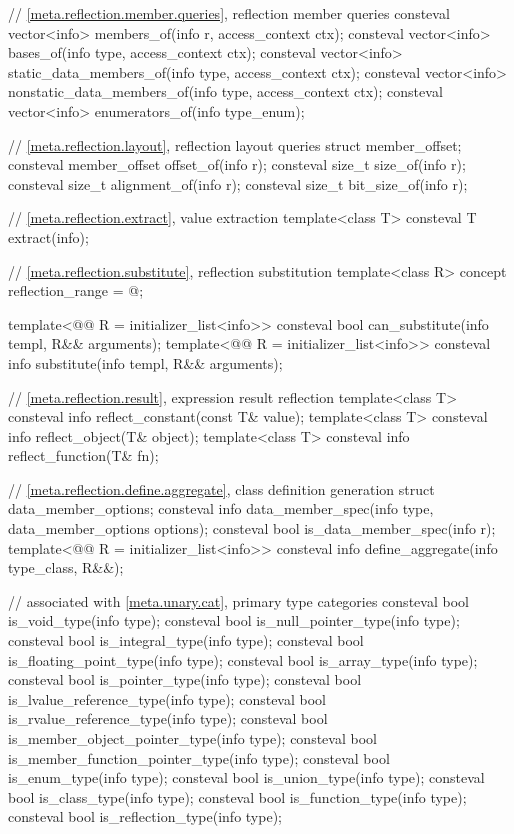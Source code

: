 \begin{codeblock}
{  // \ref{meta.reflection.member.queries}, reflection member queries
  consteval vector<info> members_of(info r, access_context ctx);
  consteval vector<info> bases_of(info type, access_context ctx);
  consteval vector<info> static_data_members_of(info type, access_context ctx);
  consteval vector<info> nonstatic_data_members_of(info type, access_context ctx);
  consteval vector<info> enumerators_of(info type_enum);

  // \ref{meta.reflection.layout}, reflection layout queries
  struct member_offset;
  consteval member_offset offset_of(info r);
  consteval size_t size_of(info r);
  consteval size_t alignment_of(info r);
  consteval size_t bit_size_of(info r);

  // \ref{meta.reflection.extract}, value extraction
  template<class T>
    consteval T extract(info);

  // \ref{meta.reflection.substitute}, reflection substitution
  template<class R>
    concept reflection_range = @\seebelow@;

  template<@@ R = initializer_list<info>>
    consteval bool can_substitute(info templ, R&& arguments);
  template<@@ R = initializer_list<info>>
    consteval info substitute(info templ, R&& arguments);

  // \ref{meta.reflection.result}, expression result reflection
  template<class T>
    consteval info reflect_constant(const T& value);
  template<class T>
    consteval info reflect_object(T& object);
  template<class T>
    consteval info reflect_function(T& fn);

  // \ref{meta.reflection.define.aggregate}, class definition generation
  struct data_member_options;
  consteval info data_member_spec(info type, data_member_options options);
  consteval bool is_data_member_spec(info r);
  template<@@ R = initializer_list<info>>
  consteval info define_aggregate(info type_class, R&&);

  // associated with \ref{meta.unary.cat}, primary type categories
  consteval bool is_void_type(info type);
  consteval bool is_null_pointer_type(info type);
  consteval bool is_integral_type(info type);
  consteval bool is_floating_point_type(info type);
  consteval bool is_array_type(info type);
  consteval bool is_pointer_type(info type);
  consteval bool is_lvalue_reference_type(info type);
  consteval bool is_rvalue_reference_type(info type);
  consteval bool is_member_object_pointer_type(info type);
  consteval bool is_member_function_pointer_type(info type);
  consteval bool is_enum_type(info type);
  consteval bool is_union_type(info type);
  consteval bool is_class_type(info type);
  consteval bool is_function_type(info type);
  consteval bool is_reflection_type(info type);

}
\end{codeblock}
